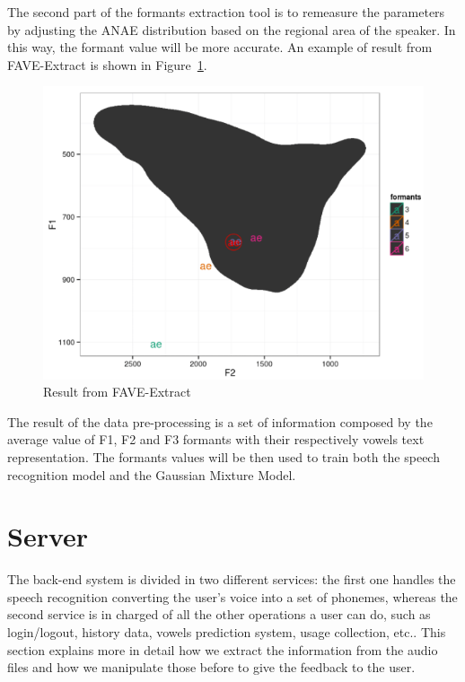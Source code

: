 \noindent The second part of the formants extraction tool is to remeasure the parameters by adjusting the ANAE distribution based on the regional area of the speaker. In this way, the formant value will be more accurate. An example of result from FAVE-Extract is shown in Figure~\ref{fig:fave-extract_example}.

\begin{figure}[!ht]
	\centering
	\includegraphics[scale=0.5]{Figures/fave-extract_example.png}
	\caption{Result from FAVE-Extract}
	\label{fig:fave-extract_example}
\end{figure}

\noindent The result of the data pre-processing is a set of information composed by the average value of F1, F2 and F3 formants with their respectively vowels text representation. The formants values will be then used to train both the speech recognition model and the Gaussian Mixture Model.

\section{Server}
\label{sec:server}

The back-end system is divided in two different services: the first one handles the speech recognition converting the user's voice into a set of phonemes, whereas the second service is in charged of all the other operations a user can do, such as login/logout, history data, vowels prediction system, usage collection, etc.. This section explains more in detail how we extract the information from the audio files and how we manipulate those before to give the feedback to the user.

